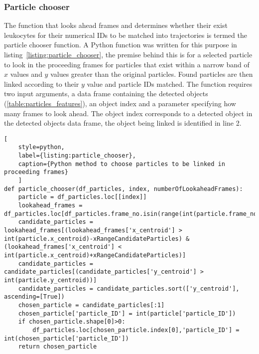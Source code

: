 \subsubsection{Particle chooser}
The function that looks ahead frames and determines whether their exist leukocytes for their numerical IDs to be matched into trajectories is termed the particle chooser function. A Python function was written for this purpose in listing~\ref{listing:particle_chooser}, the premise behind this is for a selected particle to look in the proceeding frames for particles that exist within a narrow band of $x$ values and $y$ values greater than the original particles. Found particles are then linked according to their $y$ value and particle IDs matched. The function requires two input arguments, a data frame containing the detected objects (\ref{table:particles_features}), an object index and a parameter specifying how many frames to look ahead. The object index corresponds to a detected object in the detected objects data frame, the object being linked is identified in line 2.
\begin{lstlisting}[
	style=python,
	label={listing:particle_chooser},
	caption={Python method to choose particles to be linked in proceeding frames}
	]
def particle_chooser(df_particles, index, numberOfLookaheadFrames):
    particle = df_particles.loc[[index]]
    lookahead_frames = df_particles.loc[df_particles.frame_no.isin(range(int(particle.frame_no+1),int(particle.frame_no+numberOfLookaheadFrames)))]
    candidate_particles = lookahead_frames[(lookahead_frames['x_centroid'] > int(particle.x_centroid)-xRangeCandidateParticles) & (lookahead_frames['x_centroid'] < int(particle.x_centroid)+xRangeCandidateParticles)]
    candidate_particles = candidate_particles[(candidate_particles['y_centroid'] > int(particle.y_centroid))]
    candidate_particles = candidate_particles.sort(['y_centroid'], ascending=[True])
    chosen_particle = candidate_particles[:1]
    chosen_particle['particle_ID'] = int(particle['particle_ID'])
    if chosen_particle.shape[0]>0:
        df_particles.loc[chosen_particle.index[0],'particle_ID'] = int(chosen_particle['particle_ID'])
    return chosen_particle
\end{lstlisting}
